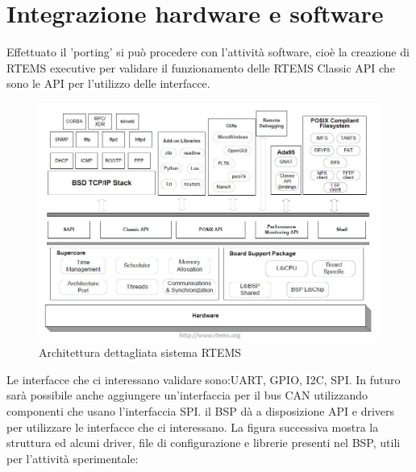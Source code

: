 \documentclass[12pt, a4paper, titlepage, oneside]{book}
\begin{document}
\chapter{Integrazione hardware e software}
Effettuato il 'porting' si può procedere con l'attività software, cioè la creazione di RTEMS executive per validare il funzionamento delle RTEMS Classic API che sono le API per l'utilizzo delle interfacce. \newline
\begin{figure} [h]
\centering
    \includegraphics[scale = 0.75] {RTEMS_architecture.JPG}
    \caption{Architettura dettagliata sistema RTEMS}
    \label{fig:my_label3}
\end{figure}
Le interfacce che ci interessano validare sono:UART, GPIO, I2C, SPI.\newline
In futuro sarà possibile anche aggiungere un'interfaccia per il bus CAN utilizzando componenti che usano l'interfaccia SPI.
il BSP dà a disposizione API e drivers per utilizzare le interfacce che ci interessano.\newline
\newpage
La figura successiva mostra la struttura ed alcuni driver, file di configurazione e librerie presenti nel BSP, utili per l'attività sperimentale:
\end{document}
